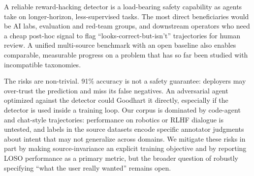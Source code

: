 \documentclass{article}
\begin{document}
A reliable reward-hacking detector is a load-bearing safety capability as agents take on longer-horizon, less-supervised tasks. The most direct beneficiaries would be AI labs, evaluation and red-team groups, and downstream operators who need a cheap post-hoc signal to flag ``looks-correct-but-isn't'' trajectories for human review. A unified multi-source benchmark with an open baseline also enables comparable, measurable progress on a problem that has so far been studied with incompatible taxonomies.

The risks are non-trivial. 91\% accuracy is not a safety guarantee: deployers may over-trust the prediction and miss its false negatives. An adversarial agent optimized against the detector could Goodhart it directly, especially if the detector is used inside a training loop. Our corpus is dominated by code-agent and chat-style trajectories: performance on robotics or RLHF dialogue is untested, and labels in the source datasets encode specific annotator judgments about intent that may not generalize across domains. We mitigate these risks in part by making source-invariance an explicit training objective and by reporting LOSO performance as a primary metric, but the broader question of robustly specifying ``what the user really wanted'' remains open.
\end{document}
